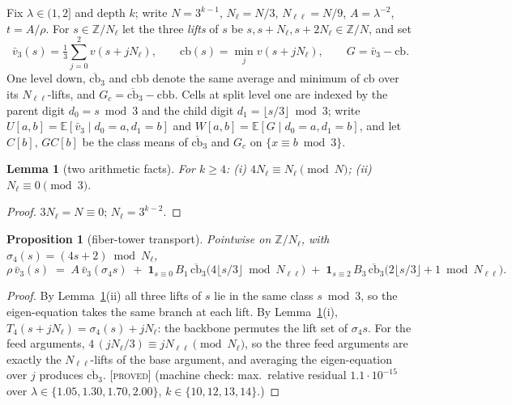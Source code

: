 \documentclass[11pt]{article}
\newtheorem{lemma}[theorem]{Lemma}
\newtheorem{proposition}[theorem]{Proposition}
\theoremstyle{definition}
\newcommand{\PROVED}{\textup{[\textsc{proved}]}}
\newcommand{\Z}{\mathbb{Z}}
\newcommand{\E}{\mathbb{E}}
\newcommand{\lam}{\lambda}
\begin{document}
Fix $\lam \in (1,2]$ and depth $k$; write $N = 3^{k-1}$, $N_\ell = N/3$,
$N_{\ell\ell} = N/9$, $A = \lam^{-2}$, $t = A/\rho$. For $s \in \Z/N_\ell$
let the three \emph{lifts} of $s$ be $s, s+N_\ell, s+2N_\ell \in \Z/N$, and set
\[
\bar v_3(s) = \tfrac13\sum_{j=0}^{2} v(s+jN_\ell), \qquad
\mathrm{cb}(s) = \min_{j} v(s+jN_\ell), \qquad
G = \bar v_3 - \mathrm{cb} .
\]
One level down, $\overline{\mathrm{cb}}_3$ and $\mathrm{cbb}$ denote the same
average and minimum of $\mathrm{cb}$ over its $N_{\ell\ell}$-lifts, and
$G_c = \overline{\mathrm{cb}}_3 - \mathrm{cbb}$.
Cells at split level one are indexed by the parent digit $d_0 = s \bmod 3$ and
the child digit $d_1 = \lfloor s/3 \rfloor \bmod 3$; write
$U[a,b] = \E[\bar v_3 \mid d_0 = a, d_1 = b]$ and
$W[a,b] = \E[G \mid d_0 = a, d_1 = b]$, and let
$C[b], \, GC[b]$ be the class means of $\overline{\mathrm{cb}}_3$ and $G_c$
on $\{x \equiv b \bmod 3\}$.

\begin{lemma}[two arithmetic facts]\label{lem:arith}
For $k \ge 4$: (i) $4N_\ell \equiv N_\ell \pmod N$; (ii) $N_\ell \equiv 0
\pmod 3$.
\end{lemma}

\begin{proof}
$3N_\ell = N \equiv 0$; $N_\ell = 3^{k-2}$.
\end{proof}

\begin{proposition}[fiber-tower transport]\label{prop:tower}
Pointwise on $\Z/N_{\ell}$, with $\sigma_4(s) = (4s+2) \bmod N_\ell$,
\[
\rho\,\bar v_3(s) \;=\; A\,\bar v_3(\sigma_4 s)
\;+\; \mathbf 1_{s \equiv 0}\, B_1\, \overline{\mathrm{cb}}_3\!\big(4\lfloor s/3\rfloor \bmod N_{\ell\ell}\big)
\;+\; \mathbf 1_{s \equiv 2}\, B_3\, \overline{\mathrm{cb}}_3\!\big(2\lfloor s/3\rfloor + 1 \bmod N_{\ell\ell}\big).
\]
\end{proposition}

\begin{proof}
By Lemma~\ref{lem:arith}(ii) all three lifts of $s$ lie in the same class
$s \bmod 3$, so the eigen-equation takes the same branch at each lift. By
Lemma~\ref{lem:arith}(i), $T_4(s + jN_\ell) = \sigma_4(s) + jN_\ell$: the
backbone permutes the lift set of $\sigma_4 s$. For the feed arguments,
$4\,(jN_\ell/3) \equiv jN_{\ell\ell} \pmod{N_\ell}$, so the three feed
arguments are exactly the $N_{\ell\ell}$-lifts of the base argument, and
averaging the eigen-equation over $j$ produces
$\overline{\mathrm{cb}}_3$. \PROVED{} (machine check: max.\ relative residual
$1.1 \cdot 10^{-15}$ over $\lam \in \{1.05, 1.30, 1.70, 2.00\}$,
$k \in \{10,12,13,14\}$.)
\end{proof}
\end{document}

